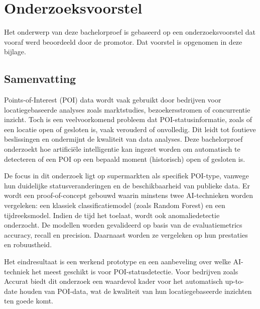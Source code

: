 \documentclass[dutch,dit,thesis]{hogentreport}
\begin{document}





%





\appendix

\chapter{Onderzoeksvoorstel}

Het onderwerp van deze bachelorproef is gebaseerd op een onderzoeksvoorstel dat vooraf werd beoordeeld door de promotor. Dat voorstel is opgenomen in deze bijlage.

\section*{Samenvatting}
Points-of-Interest (POI) data wordt vaak gebruikt door bedrijven voor locatiegebaseerde analyses zoals marktstudies, bezoekersstromen of concurrentie inzicht. Toch is een veelvoorkomend probleem dat POI-statusinformatie, zoals of een locatie open of gesloten is, vaak verouderd of onvolledig. Dit leidt tot foutieve beslissingen en ondermijnt de kwaliteit van data analyses. Deze bachelorproef onderzoekt hoe artificiële intelligentie kan ingezet worden om automatisch te detecteren of een POI op een bepaald moment (historisch) open of gesloten is. 

De focus in dit onderzoek ligt op supermarkten als specifiek POI-type, vanwege hun duidelijke statusveranderingen en de beschikbaarheid van publieke data. Er wordt een proof-of-concept gebouwd waarin minstens twee AI-technieken worden vergeleken: een klassiek classificatiemodel (zoals Random Forest) en een tijdreeksmodel. Indien de tijd het toelaat, wordt ook anomaliedetectie onderzocht. De modellen worden gevalideerd op basis van de evaluatiemetrics accuracy, recall en precision. Daarnaast worden ze vergeleken op hun prestaties en robuustheid. 

Het eindresultaat is een werkend prototype en een aanbeveling over welke AI-techniek het meest geschikt is voor POI-statusdetectie. Voor bedrijven zoals Accurat biedt dit onderzoek een waardevol kader voor het automatisch up-to-date houden van POI-data, wat de kwaliteit van hun locatiegebaseerde inzichten ten goede komt.
\end{document}
